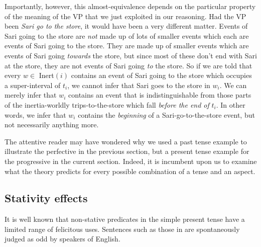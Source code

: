 Importantly, however, this almost-equivalence depends on the particular property
of the meaning of the VP that we just exploited in our reasoning. Had the VP
been \emph{Sari go to the store}, it would have been a very different matter.
Events of Sari going to the store are \emph{not} made up of lots of smaller
events which each are events of Sari going to the store. They are made up of
smaller events which are events of Sari going \emph{towards} the store, but
since most of these don't end with Sari at the store, they are not events of
Sari going \emph{to} the store. So if we are told that every $w \in$ Inert$(i)$
contains an event of Sari going to the store which occupies a super-interval of
$t_{i}$, we cannot infer that Sari goes to the store in $w_{i}$. We can merely
infer that $w_{i}$ contains an event that is indistinguishable from those parts
of the inertia-worldly trips-to-the-store which fall \emph{before the end of}
$t_{i}$. In other words, we infer that $w_{i}$ contains the \emph{beginning} of
a Sari-go-to-the-store event, but not necessarily anything more.

The attentive reader may have wondered why we used a past tense example to
illustrate the perfective in the previous section, but a present tense example
for the progressive in the current section. Indeed, it is incumbent upon us to
examine what the theory predicts for every possible combination of a tense and
an aspect.

\subsection{Stativity effects}
\label{sec:stativity}

%
It is well known that non-stative predicates in the simple present tense have a
limited range of felicitous uses. Sentences such as those in \Next are
spontaneously judged as odd by speakers of English.

